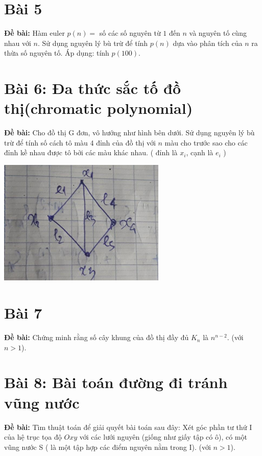 \documentclass[12pt]{article}
\begin{document}
\begin{sloppypar}
\section{Bài 5}
\begin{tcolorbox}
    \textbf{Đề bài:} Hàm euler \(p(n)=\) số các số nguyên từ \(1\) đến \(n\) và nguyên tố cùng nhau với \(n\). Sử dụng nguyên lý bù trừ để tính \(p(n)\) dựa vào phân tích của \(n\) ra thừa số nguyên tố. Áp dụng: tính \(p(100)\).
\end{tcolorbox}

\section{Bài 6: Đa thức sắc tố đồ thị(chromatic polynomial)}
\begin{tcolorbox}
    \textbf{Đề bài:} Cho đồ thị G đơn, vô hướng như hình bên dưới.  Sử dụng nguyên lý bù trừ để tính số cách tô màu 4 đỉnh của đồ thị với  \(n\) màu cho trước sao cho các đỉnh kề nhau được tô bởi các màu khác nhau. ( đỉnh là \(x_{i}\), cạnh là \(e_{i}\) )
\end{tcolorbox}

\begin{center}
    {\includegraphics[width=8cm]{6.png}}
\end{center}

\section{Bài 7}
\begin{tcolorbox}
    \textbf{Đề bài:} Chứng minh rằng số cây khung của đồ thị đầy đủ \(K_{n}\) là \(n^{n-2}\).
    (với \(n > 1\)).
\end{tcolorbox}

\section{Bài 8: Bài toán đường đi tránh vũng nước}
\begin{tcolorbox}
    \textbf{Đề bài:} Tìm thuật toán để giải quyết bài toán sau đây: Xét góc phần tư thứ I của hệ trục tọa độ \(Oxy\) với các lưới nguyên (giống như giấy tập có ô), có một vũng nước S ( là một tập hợp các điểm nguyên nằm trong I).
    (với \(n > 1\)).
\end{tcolorbox}


\end{sloppypar}
\end{document}
